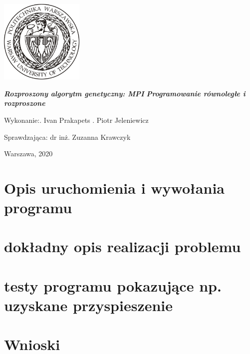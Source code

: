 \documentclass[a4paper, 12pt]{article}
\newcommand{\mainmatter}{\clearpage \cfoot{\thepage\ of \pageref{LastPage}}
\pagenumbering{arabic}}
\begin{document}
	\begin{titlepage}
\includegraphics[width = 40mm]{logo.jpg}
		\begin{center}
    			\vspace{3cm}
    					\Large\textit{\textbf{Rozproszony algorytm genetyczny: MPI}}
    					\Large\textit{\textbf{Programowanie równoległe i rozproszone}}
   			\vspace{4cm}
		\end{center} 

		\hfill\begin{minipage}{0.54\textwidth}
			\Large Wykonanie:. Ivan Prakapets  . Piotr Jeleniewicz 
		\vspace{\baselineskip}
		\end{minipage}
		
		\hfill\begin{minipage}{0.54\textwidth}
			\Large Sprawdzająca:\newline
		 		dr inż. Zuzanna Krawczyk
\vspace{\baselineskip}
		\end{minipage}
	
		\hfill\begin{minipage}{0.7\textwidth}
		\vspace{1cm}
			\Large Warszawa, 2020
			\vspace{\baselineskip}
		\end{minipage}
	\end{titlepage}
\newpage
\mainmatter
\setlength{\headheight}{15pt}
\doublespacing
\tableofcontents
\newpage

\linespread{0.5}

\section{Opis uruchomienia i wywołania programu}
\section{dokładny opis realizacji problemu}
\section{testy programu pokazujące np. uzyskane przyspieszenie}
\section{Wnioski} 


\label{LastPage}~
\label{LastPageOfBackMatter}~		
\end{document}
